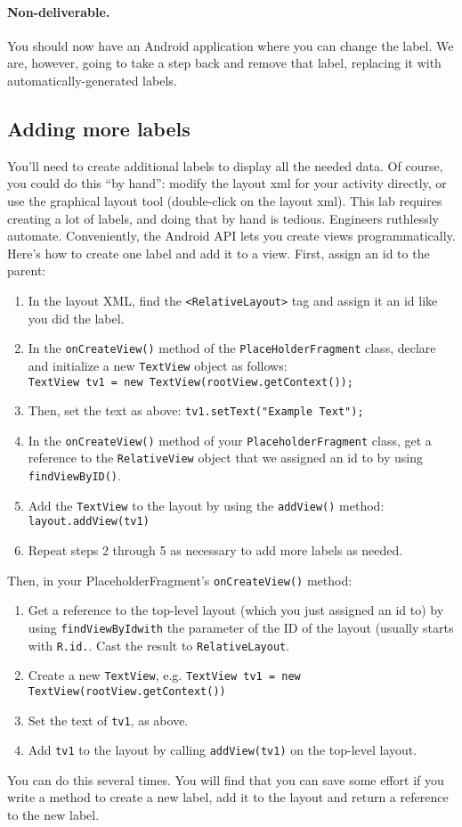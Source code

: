 \documentclass[10pt]{article}
\begin{document}
\paragraph{Non-deliverable.} You should now have an Android application where you can change the label. We are, however, going to take a step back and remove that label, replacing it with automatically-generated labels.
\subsection{Adding more labels}
You'll need to create additional labels to display all the needed data. Of course, you could do this ``by hand'': modify the layout xml for your activity directly, or use the graphical layout tool (double-click on the layout xml). This lab requires creating a lot of labels, and doing that by hand is tedious. Engineers ruthlessly automate. Conveniently, the Android API lets you create views programmatically. Here's how to create one label and add it to a view. First, assign an id to the parent:
\begin{enumerate}
\item In the layout XML, find the \texttt{<RelativeLayout>} tag and assign it an id like you did the label.
\item In the \texttt{onCreateView()} method of the \texttt{PlaceHolderFragment} class, declare and initialize a new \texttt{TextView} object as follows:\\
\texttt{TextView tv1 = new TextView(rootView.getContext());}
\item Then, set the text as above: \texttt{tv1.setText("Example Text");}
\item In the \texttt{onCreateView()} method of your \texttt{PlaceholderFragment} class, get a reference to the \texttt{RelativeView} object that we assigned an id to by using \texttt{findViewByID()}.
\item Add the \texttt{TextView} to the layout by using the \texttt{addView()} method:
\texttt{layout.addView(tv1)}
\item Repeat steps 2 through 5 as necessary to add more labels as needed.
\end{enumerate}
Then, in your PlaceholderFragment's {\tt onCreateView()} method:
\begin{enumerate}
\item Get a reference to the top-level layout (which you just assigned an id to) by using \texttt{findViewByIdwith} the parameter of the ID of the layout (usually starts with \texttt{R.id.}. Cast the result to \texttt{RelativeLayout}.
\item Create a new \texttt{TextView}, e.g. \texttt{TextView tv1 = new TextView(rootView.getContext())}
\item Set the text of \texttt{tv1}, as above.
\item Add \texttt{tv1} to the layout by calling \texttt{addView(tv1)} on the top-level layout.
\end{enumerate}
You can do this several times. You will find that you can save some effort if you write a method to create a new label, add it to the layout and return a reference to the new label.
\end{document}
